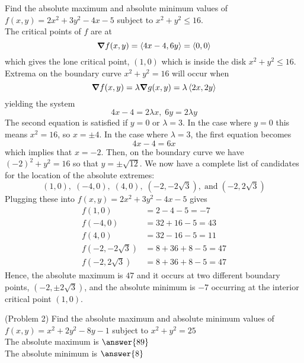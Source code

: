\documentclass[handout]{ximera}
\begin{document}
\begin{example}[Example 2]
Find the absolute maximum and absolute minimum values of $f(x,y) = 2x^2 + 3y^2 - 4x - 5$ subject to $x^2 + y^2 \leq 16$.\\
The critical points of $f$ are at
\[
\boldsymbol\nabla f(x,y) = \left\langle 4x -4, 6y\right\rangle = \left\langle 0,0\right\rangle
\]
 which gives the lone critical point, $(1,0)$ which is inside the disk $x^2 + y^2 \leq 16$.\\
 Extrema on the boundary curve $x^2 + y^2 = 16$ will occur when
 \[
 \boldsymbol\nabla f(x,y) = \lambda \boldsymbol\nabla g(x,y) = \lambda \left\langle 2x, 2y\right\rangle
 \]
 yielding the system
 \[
 4x - 4 = 2\lambda x, \; 6y = 2\lambda y
 \]
 The second equation is satisfied if $y = 0$ or $\lambda = 3$.  In the case where $y = 0$ this means $x^2 = 16$, so $x = \pm 4$.
 In the case where $\lambda = 3$, the first equation becomes
 \[
 4x - 4 = 6x 
 \]
 which implies that $x = -2$.  Then, on the boundary curve we have $(-2)^2 + y^2 = 16$ so that $y = \pm \sqrt{12}$.
 We now have a complete list of candidates for the location of the absolute extremes:
 \[
 (1,0), \; (-4, 0), \; (4,0), \; (-2, -2\sqrt3), \;\text{and} \; (-2, 2\sqrt 3)
 \]
 Plugging these into $f(x,y) = 2x^2 + 3y^2 - 4x - 5$ gives
 \begin{align*}
 f(1,0) &= 2-4-5=-7\\
 f(-4, 0) &= 32 +16 -5 = 43\\
 f(4, 0) &= 32 -16 -5 = 11\\
 f(-2, -2\sqrt3) &= 8 + 36 +8-5 = 47\\
 f(-2, 2\sqrt3) &= 8 + 36 +8-5 = 47
 \end{align*}
 Hence, the absolute maximum is $47$ and it occurs at two different boundary points, $(-2, \pm 2\sqrt 3)$,
 and the absolute minimum is $-7$ occurring at the interior critical point $(1,0)$.
 
 
\end{example}

\begin{problem}(Problem 2)
Find the absolute maximum and absolute minimum values of $f(x,y) = x^2 + 2y^2 - 8y - 1$ subject to $x^2 + y^2 = 25$\\
The absolute maximum is $\answer{89}$\\
The absolute minimum is $\answer{8}$
\end{problem}
\end{document}
